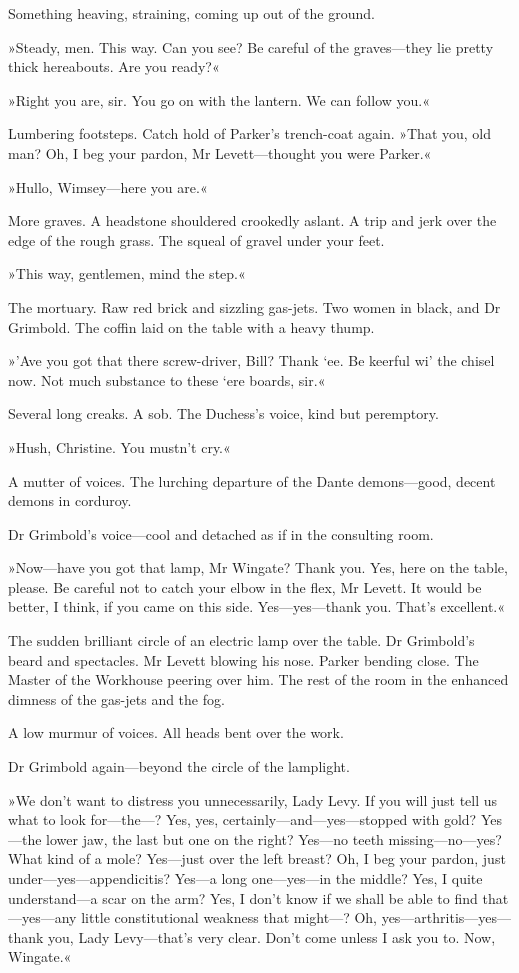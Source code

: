 Something heaving, straining, coming up out of the ground.

»Steady, men. This way. Can you see? Be careful of the graves—they lie pretty thick hereabouts. Are you ready?«

»Right you are, sir. You go on with the lantern. We can follow you.«

Lumbering footsteps. Catch hold of Parker's trench-coat again. »That you, old man? Oh, I beg your pardon, Mr Levett—thought you were Parker.«

»Hullo, Wimsey—here you are.«

More graves. A headstone shouldered crookedly aslant. A trip and jerk over the edge of the rough grass. The squeal of gravel under your feet.

»This way, gentlemen, mind the step.«

The mortuary. Raw red brick and sizzling gas-jets. Two women in black, and Dr Grimbold. The coffin laid on the table with a heavy thump.

»'Ave you got that there screw-driver, Bill? Thank `ee. Be keerful wi' the chisel now. Not much substance to these `ere boards, sir.«

Several long creaks. A sob. The Duchess's voice, kind but peremptory.

»Hush, Christine. You mustn't cry.«

A mutter of voices. The lurching departure of the Dante demons—good, decent demons in corduroy.

Dr Grimbold's voice—cool and detached as if in the consulting room.

»Now—have you got that lamp, Mr Wingate? Thank you. Yes, here on the table, please. Be careful not to catch your elbow in the flex, Mr Levett. It would be better, I think, if you came on this side. Yes—yes—thank you. That's excellent.«

The sudden brilliant circle of an electric lamp over the table. Dr Grimbold's beard and spectacles. Mr Levett blowing his nose. Parker bending close. The Master of the Workhouse peering over him. The rest of the room in the enhanced dimness of the gas-jets and the fog.

A low murmur of voices. All heads bent over the work.

Dr Grimbold again—beyond the circle of the lamplight.

»We don't want to distress you unnecessarily, Lady Levy. If you will just tell us what to look for—the---? Yes, yes, certainly—and—yes—stopped with gold? Yes—the lower jaw, the last but one on the right? Yes—no teeth missing—no—yes? What kind of a mole? Yes—just over the left breast? Oh, I beg your pardon, just under—yes—ap\-pen\-dici\-tis? Yes—a long one—yes—in the middle? Yes, I quite understand—a scar on the arm? Yes, I don't know if we shall be able to find that—yes—any little constitutional weakness that might---? Oh, yes—arthritis—yes—thank you, Lady Levy—that's very clear. Don't come unless I ask you to. Now, Wingate.«

